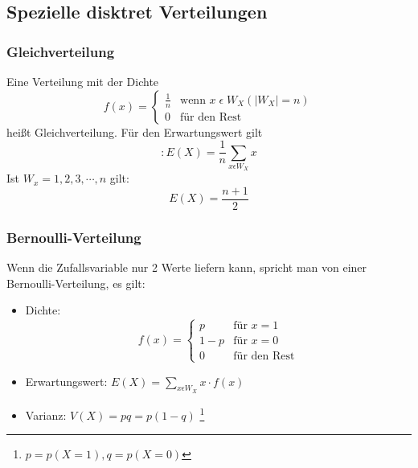 \documentclass[a4paper]{scrartcl}
\begin{document}
        \subsection{Spezielle disktret Verteilungen}
            \subsubsection{Gleichverteilung}
                Eine Verteilung mit der Dichte 
                \[f(x)=
                    \begin{cases}
                        \frac{1}{n} & \text{wenn } x \; \epsilon \; W_X (|W_X| = n)\\
                        0 & \text{für den Rest} 
                    \end{cases}
                \] 
                heißt Gleichverteilung. Für den Erwartungswert gilt 
                \begin{equation*}:
                    E(X) = \frac{1}{n} \sum\limits_{x\epsilon W_X} x
                \end{equation*}
                Ist  \(W_x = 1,2,3, \cdots ,n\) gilt: 
                \begin{equation*}
                    E(X) = \frac{n+1}{2}
                \end{equation*} 
            \subsubsection{Bernoulli-Verteilung}
                Wenn die Zufallsvariable nur 2 Werte liefern kann, spricht man von einer Bernoulli-Verteilung, es gilt:
                \begin{itemize}
                    \item Dichte: \[f(x)=
                                                        \begin{cases}
                                                            p     & \text{für } x = 1 \\
                                                            1 - p & \text{für } x = 0 \\
                                                            0     & \text{für den Rest} 
                                                        \end{cases}
                                                        \] 
                    \item Erwartungswert: \(E(X) = \sum\limits_{x \epsilon W_X} x \cdot f(x) \)
                    \item Varianz: \(V(X) = pq = p (1 - q)\) \footnote{\(p = p(X=1), q = p(X=0)\)} %
                \end{itemize}
\end{document}
